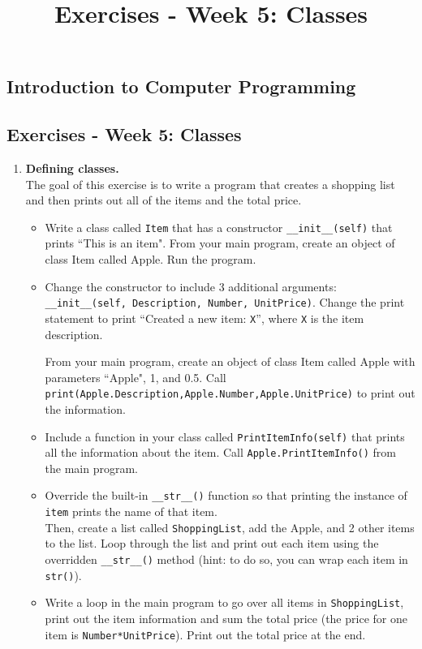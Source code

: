 \documentclass[11pt]{report}
\begin{document}
\title{Exercises - Week 5: Classes}
\subsection*{Introduction to Computer Programming}
\subsection*{Exercises - Week 5: Classes}
\begin{enumerate}
	\item {\bf Defining classes.}\\
	The goal of this exercise is to write a program that creates a shopping list and then prints out all of the items and the total price.
	\begin{itemize}
		\item Write a class called {\tt Item} that has a constructor \verb|__init__(self)| that prints ``This is an item". From your main program, create an object of class Item called Apple. Run the program.
		\item Change the constructor to include 3 additional arguments: \\\verb|__init__(self, Description, Number, UnitPrice)|. Change the print statement to print ``Created a new item: {\tt X}'', where {\tt X} is the item description.

		From your main program, create an object of class Item called Apple with parameters ``Apple", 1, and 0.5. Call {\tt print(Apple.Description,Apple.Number,Apple.UnitPrice)} to print out the information.
		\item Include a function in your class called {\tt PrintItemInfo(self)} that prints all the information about the item. Call {\tt Apple.PrintItemInfo()} from the main program.
		\item Override the built-in \verb|__str__()| function so that printing the instance of {\tt item} prints the name of that item.\\
		Then, create a list called {\tt ShoppingList}, add the Apple, and 2 other items to the list. Loop through the list and print out each item using the overridden \verb|__str__()| method (hint: to do so, you can wrap each item in {\tt str()}).
		\item Write a loop in the main program to go over all items in {\tt ShoppingList}, print out the item information and sum the total price (the price for one item is {\tt Number*UnitPrice}). Print out the total price at the end.
	\end{itemize}


\end{enumerate}
\end{document}
